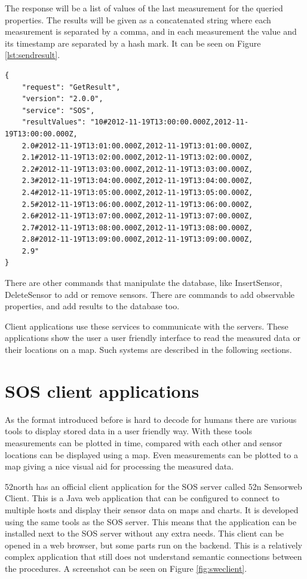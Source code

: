 The response will be a list of values of the last measurement for the queried properties. The results will be given as a concatenated string where each measurement is separated by a comma, and in each measurement the value and its timestamp are separated by a hash mark. It can be seen on Figure \ref{lst:sendresult}.

\begin{lstlisting}[caption={JSON GetResult response\label{lst:sendresult}}]
{
    "request": "GetResult",
    "version": "2.0.0",
    "service": "SOS",
    "resultValues": "10#2012-11-19T13:00:00.000Z,2012-11-19T13:00:00.000Z,
    2.0#2012-11-19T13:01:00.000Z,2012-11-19T13:01:00.000Z,
    2.1#2012-11-19T13:02:00.000Z,2012-11-19T13:02:00.000Z,
    2.2#2012-11-19T13:03:00.000Z,2012-11-19T13:03:00.000Z,
    2.3#2012-11-19T13:04:00.000Z,2012-11-19T13:04:00.000Z,
    2.4#2012-11-19T13:05:00.000Z,2012-11-19T13:05:00.000Z,
    2.5#2012-11-19T13:06:00.000Z,2012-11-19T13:06:00.000Z,
    2.6#2012-11-19T13:07:00.000Z,2012-11-19T13:07:00.000Z,
    2.7#2012-11-19T13:08:00.000Z,2012-11-19T13:08:00.000Z,
    2.8#2012-11-19T13:09:00.000Z,2012-11-19T13:09:00.000Z,
    2.9"
}
\end{lstlisting}

There are other commands that manipulate the database, like InsertSensor, DeleteSensor to add or remove sensors. There are commands to add observable properties, and add results to the database too. 

Client applications use these services to communicate with the servers. These applications show the user a user friendly interface to read the measured data or their locations on a map. Such systems are described in the following sections.

\section{SOS client applications}

As the format introduced before is hard to decode for humans there are various tools to display stored data in a user friendly way. With these tools measurements can be plotted in time, compared with each other and sensor locations can be displayed using a map. Even measurements can be plotted to a map giving a nice visual aid for processing the measured data. 

52north has an official client application for the SOS server called 52n Sensorweb Client. This is a Java web application that can be configured to connect to multiple hosts and display their sensor data on maps and charts. It is developed using the same tools as the SOS server. 
This means that the application can be installed next to the SOS server without any extra needs. This client can be opened in a web browser, but some parts run on the backend. This is a relatively complex application that still does not understand semantic connections between the procedures. A screenshot can be seen on Figure \ref{fig:sweclient}.

